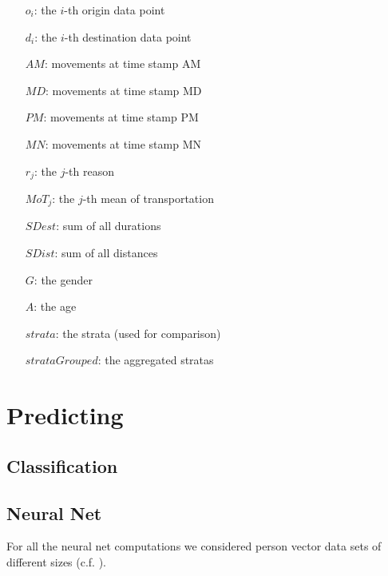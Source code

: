 \documentclass[runningheads]{llncs}
\begin{document}
	\begin{multicols}{2}
		\begin{itemize}
			\setlength{\itemindent}{.4cm}
			\item[$o_i$:]  the $i$-th origin data point
			\item[$d_i$:]  the $i$-th destination data point
			\item[$\mathit{AM}$:] movements at time stamp AM
			\item[$\mathit{MD}$:] movements at time stamp MD
			\item[$\mathit{PM}$:] movements at time stamp PM
			\item[$\mathit{MN}$:] movements at time stamp MN
			\item[$r_j$:] the $j$-th reason
			\item[$\mathit{MoT}_j$:] the $j$-th mean of transportation
			\item[$\mathit{SDest}$:] sum of all durations
			\item[$\mathit{SDist}$:] sum of all distances
			\item[$\mathit{G}$:] the gender
			\item[$\mathit{A}$:] the age
			\item[$strata$:] the strata (used for comparison)
			\item[$strataGrouped$:] the aggregated stratas
		\end{itemize}
	\end{multicols}
	\section{Predicting}
	
	\subsection{Classification}
%	
	\subsection{Neural Net}
	For all the neural net computations we considered person vector data sets of different sizes (c.f. ).\\
	
\end{document}
